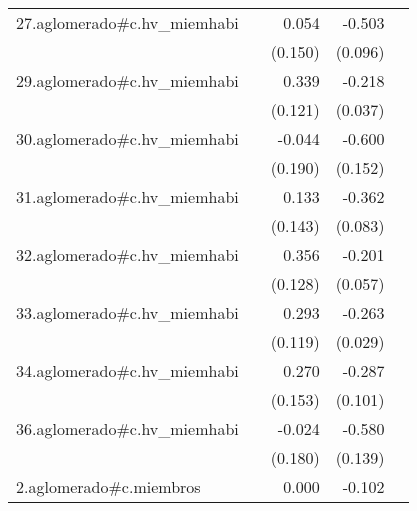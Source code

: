 {\begin{longtable}{l*{4}{D{.}{.}{-1}}}
\addlinespace
27.aglomerado#c.hv\_miemhabi&                     &       0.054         &      -0.503\sym{***}&                     \\
            &                     &     (0.150)         &     (0.096)         &                     \\
\addlinespace
29.aglomerado#c.hv\_miemhabi&                     &       0.339\sym{**} &      -0.218\sym{***}&                     \\
            &                     &     (0.121)         &     (0.037)         &                     \\
\addlinespace
30.aglomerado#c.hv\_miemhabi&                     &      -0.044         &      -0.600\sym{***}&                     \\
            &                     &     (0.190)         &     (0.152)         &                     \\
\addlinespace
31.aglomerado#c.hv\_miemhabi&                     &       0.133         &      -0.362\sym{***}&                     \\
            &                     &     (0.143)         &     (0.083)         &                     \\
\addlinespace
32.aglomerado#c.hv\_miemhabi&                     &       0.356\sym{**} &      -0.201\sym{***}&                     \\
            &                     &     (0.128)         &     (0.057)         &                     \\
\addlinespace
33.aglomerado#c.hv\_miemhabi&                     &       0.293\sym{*}  &      -0.263\sym{***}&                     \\
            &                     &     (0.119)         &     (0.029)         &                     \\
\addlinespace
34.aglomerado#c.hv\_miemhabi&                     &       0.270         &      -0.287\sym{**} &                     \\
            &                     &     (0.153)         &     (0.101)         &                     \\
\addlinespace
36.aglomerado#c.hv\_miemhabi&                     &      -0.024         &      -0.580\sym{***}&                     \\
            &                     &     (0.180)         &     (0.139)         &                     \\
\addlinespace
2.aglomerado#c.miembros&                     &       0.000         &      -0.102\sym{***}&                     \\

\end{longtable}}
